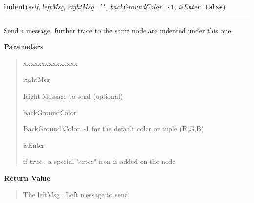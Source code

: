 \hspace{.8\funcindent}\begin{boxedminipage}{\funcwidth}

    \raggedright \textbf{indent}(\textit{self}, \textit{leftMsg}, \textit{rightMsg}={\tt \texttt{'}\texttt{}\texttt{'}}, \textit{backGroundColor}={\tt -1}, \textit{isEnter}={\tt False})

    \vspace{-1.5ex}

    \rule{\textwidth}{0.5\fboxrule}
\setlength{\parskip}{2ex}
    Send a message. further trace to the same node are indented under this 
    one.

\setlength{\parskip}{1ex}
      \textbf{Parameters}
      \vspace{-1ex}

      \begin{quote}
        \begin{Ventry}{xxxxxxxxxxxxxxx}

          \item[rightMsg]

          Right Message to send (optional)

          \item[backGroundColor]

          BackGround Color. -1 for the default color or tuple (R,G,B)

          \item[isEnter]

          if true , a special "enter" icon is added on the node

        \end{Ventry}

      \end{quote}

      \textbf{Return Value}
    \vspace{-1ex}

      \begin{quote}
      The leftMsg : Left message to send

      \end{quote}

    \end{boxedminipage}

    \label{tracetool:TraceToSend:unIndent}

    \vspace{0.5ex}

